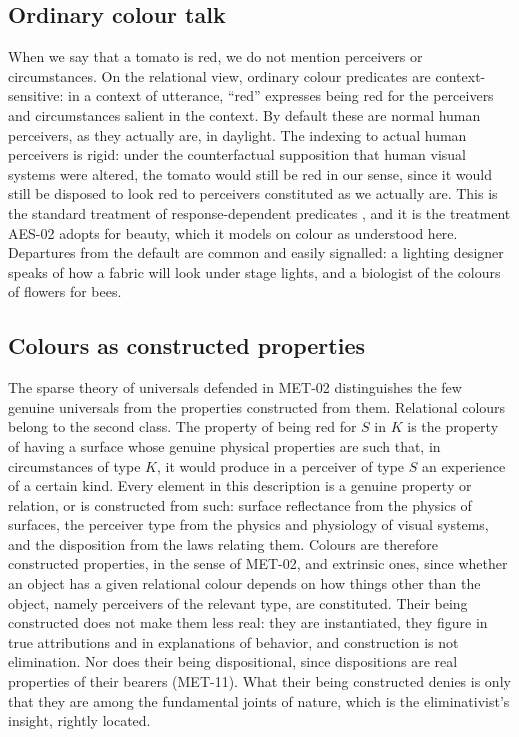 \documentclass{situationist-preprint}
\begin{document}
\subsection{Ordinary colour talk}

When we say that a tomato is red, we do not mention perceivers or circumstances. On the relational view, ordinary colour predicates are context-sensitive: in a context of utterance, \enquote{red} expresses being red for the perceivers and circumstances salient in the context. By default these are normal human perceivers, as they actually are, in daylight. The indexing to actual human perceivers is rigid: under the counterfactual supposition that human visual systems were altered, the tomato would still be red in our sense, since it would still be disposed to look red to perceivers constituted as we actually are. This is the standard treatment of response-dependent predicates \citep{Johnston1992}, and it is the treatment AES-02 adopts for beauty, which it models on colour as understood here. Departures from the default are common and easily signalled: a lighting designer speaks of how a fabric will look under stage lights, and a biologist of the colours of flowers for bees.

\subsection{Colours as constructed properties}

The sparse theory of universals defended in MET-02 distinguishes the few genuine universals from the properties constructed from them. Relational colours belong to the second class. The property of being red for $S$ in $K$ is the property of having a surface whose genuine physical properties are such that, in circumstances of type $K$, it would produce in a perceiver of type $S$ an experience of a certain kind. Every element in this description is a genuine property or relation, or is constructed from such: surface reflectance from the physics of surfaces, the perceiver type from the physics and physiology of visual systems, and the disposition from the laws relating them. Colours are therefore constructed properties, in the sense of MET-02, and extrinsic ones, since whether an object has a given relational colour depends on how things other than the object, namely perceivers of the relevant type, are constituted. Their being constructed does not make them less real: they are instantiated, they figure in true attributions and in explanations of behavior, and construction is not elimination. Nor does their being dispositional, since dispositions are real properties of their bearers (MET-11). What their being constructed denies is only that they are among the fundamental joints of nature, which is the eliminativist's insight, rightly located.
\end{document}
